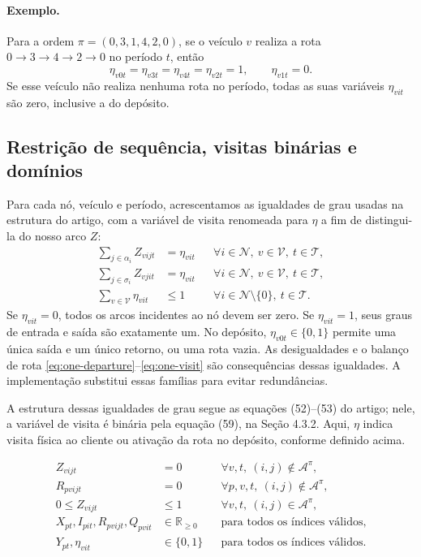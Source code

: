 \documentclass[11pt,a4paper]{article}
\newcommand{\N}{\mathcal{N}}
\newcommand{\Tset}{\mathcal{T}}
\newcommand{\Vset}{\mathcal{V}}
\newcommand{\A}{\mathcal{A}}
\begin{document}
\paragraph{Exemplo.} Para a ordem $\pi=(0,3,1,4,2,0)$, se o veículo $v$ realiza a rota $0\to3\to4\to2\to0$ no período $t$, então
\[
 \eta_{v0t}=\eta_{v3t}=\eta_{v4t}=\eta_{v2t}=1,
 \qquad \eta_{v1t}=0.
\]
Se esse veículo não realiza nenhuma rota no período, todas as suas variáveis $\eta_{vit}$ são zero, inclusive a do depósito.

\subsection{Restrição de sequência, visitas binárias e domínios}

Para cada nó, veículo e período, acrescentamos as igualdades de grau usadas na estrutura do artigo, com a variável de visita renomeada para $\eta$ a fim de distingui-la do nosso arco $Z$:
\begin{align}
 \sum_{j\in\alpha_i} Z_{vijt} &=\eta_{vit}
 && \forall i\in\N,\ v\in\Vset,\ t\in\Tset, \label{eq:visit-out}\\
 \sum_{j\in\sigma_i} Z_{vjit} &=\eta_{vit}
 && \forall i\in\N,\ v\in\Vset,\ t\in\Tset, \label{eq:visit-in}\\
 \sum_{v\in\Vset}\eta_{vit} &\le1
 && \forall i\in\N\setminus\{0\},\ t\in\Tset. \label{eq:visit-assignment}
\end{align}
Se $\eta_{vit}=0$, todos os arcos incidentes ao nó devem ser zero. Se $\eta_{vit}=1$, seus graus de entrada e saída são exatamente um. No depósito, $\eta_{v0t}\in\{0,1\}$ permite uma única saída e um único retorno, ou uma rota vazia. As desigualdades e o balanço de rota \eqref{eq:one-departure}--\eqref{eq:one-visit} são consequências dessas igualdades. A implementação substitui essas famílias para evitar redundâncias.

A estrutura dessas igualdades de grau segue as equações (52)--(53) do artigo; nele, a variável de visita é binária pela equação (59), na Seção 4.3.2. Aqui, $\eta$ indica visita física ao cliente ou ativação da rota no depósito, conforme definido acima.

\begin{align}
 Z_{vijt} &=0 && \forall v,t,\ (i,j)\notin\A^\pi, \label{eq:sequence-fix}\\
 R_{pvijt} &=0 && \forall p,v,t,\ (i,j)\notin\A^\pi, \label{eq:forbidden-load}\\
 0\le Z_{vijt} &\le1 && \forall v,t,\ (i,j)\in\A^\pi, \label{eq:continuous-arcs}\\
 X_{pt},I_{pit},R_{pvijt},Q_{pvit} &\in\mathbb{R}_{\ge0}
 && \text{para todos os índices válidos}, \label{eq:continuous-quantities}\\
 Y_{pt},\eta_{vit} &\in\{0,1\}
 && \text{para todos os índices válidos}. \label{eq:binary-dom}
\end{align}
\end{document}
